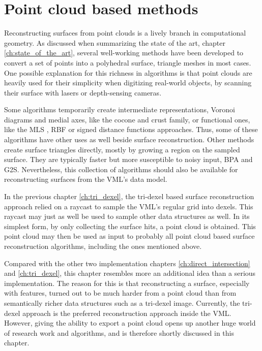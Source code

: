 
\chapter{Point cloud based methods}
\label{ch:point_cloud_based}

Reconstructing surfaces from point clouds is a lively branch in computational geometry.
As discussed when summarizing the state of the art, \cf chapter \ref{ch:state_of_the_art}, several well-working methods have been developed to convert a set of points into a polyhedral surface, \ie triangle meshes in most cases.
One possible explanation for this richness in algorithms is that point clouds are heavily used for their simplicity when digitizing real-world objects, \eg by scanning their surface with lasers or depth-sensing cameras.

Some algorithms temporarily create intermediate representations, \eg Voronoi diagrams and medial axes, like the cocone \cite{cocone, tight_cocone, robust_cocone} and crust \cite{crust, power_crust} family, or functional ones, like the MLS \cite{mls}, RBF \cite{rbf} or signed distance functions \cite{sdf_surface_reconstruction} approaches.
Thus, some of these algorithms have other uses as well beside surface reconstruction.
Other methods create surface triangles directly, mostly by growing a region on the sampled surface.
They are typically faster but more susceptible to noisy input, \eg BPA and G2S.
Nevertheless, this collection of algorithms should also be available for reconstructing surfaces from the VML's data model.

In the previous chapter \ref{ch:tri_dexel}, the tri-dexel based surface reconstruction approach relied on a raycast to sample the VML's regular grid into dexels.
This raycast may just as well be used to sample other data structures as well.
In its simplest form, by only collecting the surface hits, a point cloud is obtained.
This point cloud may then be used as input to probably all point cloud based surface reconstruction algorithms, including the ones mentioned above.

Compared with the other two implementation chapters \ref{ch:direct_intersection} and \ref{ch:tri_dexel}, this chapter resembles more an additional idea than a serious implementation.
The reason for this is that reconstructing a surface, especially with features, turned out to be much harder from a point cloud than from semantically richer data structures such as a tri-dexel image.
Currently, the tri-dexel approach is the preferred reconstruction approach inside the VML.
However, giving the ability to export a point cloud opens up another huge world of research work and algorithms, and is therefore shortly discussed in this chapter.


